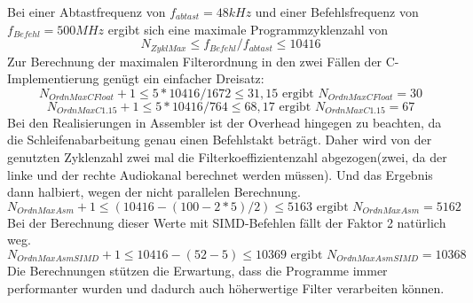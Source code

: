 Bei einer Abtastfrequenz von \( f_{abtast}=48kHz \) und einer Befehlsfrequenz von \( f_{Befehl}=500MHz \) ergibt sich eine maximale Programmzyklenzahl von
\begin{equation}
N_{ZyklMax} \leq f_{Befehl}/f_{abtast} \leq 10416 
\end{equation}
Zur Berechnung der maximalen Filterordnung in den zwei F\"allen der C-Implementierung gen\"ugt ein einfacher Dreisatz:
\begin{equation}
N_{OrdnMaxCFloat} + 1 \leq 5*10416/1672\leq 31,15 \text{ ergibt }  N_{OrdnMaxCFloat}=30
\end{equation}
\begin{equation}
N_{OrdnMaxC1.15} + 1 \leq 5*10416/764\leq 68,17 \text{ ergibt }  N_{OrdnMaxC1.15}=67
\end{equation}
Bei den Realisierungen in Assembler ist der Overhead hingegen zu beachten, da die Schleifenabarbeitung genau einen Befehlstakt betr\"agt. Daher wird von der genutzten Zyklenzahl zwei mal die Filterkoeffizientenzahl abgezogen(zwei, da der linke und der rechte Audiokanal berechnet werden m\"ussen). Und das Ergebnis dann halbiert, wegen der nicht parallelen Berechnung.
\begin{equation}
N_{OrdnMaxAsm} + 1 \leq (10416-(100-2*5)/2)\leq 5163 \text{ ergibt }  N_{OrdnMaxAsm}=5162
\end{equation}
Bei der Berechnung dieser Werte mit SIMD-Befehlen f\"allt der Faktor 2 nat\"urlich weg.
\begin{equation}
N_{OrdnMaxAsmSIMD} + 1 \leq 10416-(52-5)\leq 10369 \text{ ergibt }  N_{OrdnMaxAsmSIMD}=10368
\end{equation}
Die Berechnungen st\"utzen die Erwartung, dass die Programme immer performanter wurden und dadurch auch h\"oherwertige Filter verarbeiten k\"onnen.
